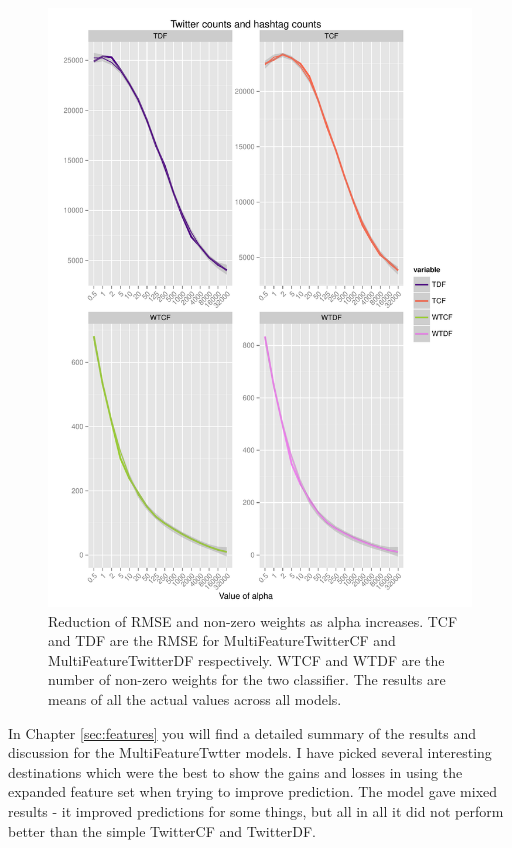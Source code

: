 \documentclass[minf,twoside,singlespacing,parskip,frontabs,notimes,11pt]{infthesis}
\begin{document}
\begin{figure}[]
\includegraphics[scale=0.8]{wrmse}
\caption{Reduction of RMSE and non-zero weights as alpha increases. TCF and TDF are the RMSE for MultiFeatureTwitterCF and MultiFeatureTwitterDF respectively. WTCF and WTDF are the number of non-zero weights for the two classifier. The results are means of all the actual values across all models. }
\label{wrmse}
\end{figure}


In Chapter \ref{sec:features} you will find a detailed summary of the results and discussion for the MultiFeatureTwtter models. I have picked several interesting destinations which were the best to show the gains and losses in using the expanded feature set when trying to improve prediction. The model gave mixed results - it improved predictions for some things, but all in all it did not perform better than the simple TwitterCF and TwitterDF.
\end{document}
